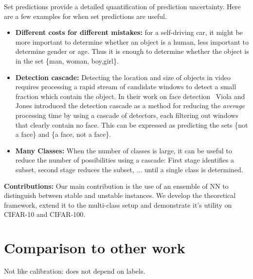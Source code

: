 \documentclass{article}
\begin{document}
Set predictions provide a detailed quantification of prediction uncertainty. Here are a few examples for when set predictions are useful.
\begin{itemize}
    \item {\bf Different costs for different mistakes:} for a self-driving car, it might be more important to determine whether an object is a human, less important to determine gender or age. Thus it is enough to determine whether the object is in the set \{man, woman, boy,girl\}. 
    \item {\bf Detection cascade:} Detecting the location and size of objects in video requires processing a rapid stream of candidate windows to detect a small fraction which contain the object. In their work on face detection~\cite{ViolaJones} Viola and Jones introduced the detection cascade as a method for reducing the {\em average} processing time by using a cascade of detectors, each filtering out windows that clearly contain no face. This can be expressed as predicting the sets \{not a face\} and \{a face, not a face\}.
    \item {\bf Many Classes:} When the number of classes is large, it can be useful to reduce the number of possibilities using a cascade: First stage identifies a subset, second stage reduces the subset, ... until a single class is determined. 
\end{itemize}

{\bf Contributions:} Our main contribution is the use of an ensemble of NN to distinguish between stable and unstable instances. We develop the theoretical framework, extend it to the multi-class setup and demonstrate it's utility on CIFAR-10 and CIFAR-100.


\section{Comparison to other work}
\label{sec:OtherWork}
Not like calibration: does not depend on labels.
\end{document}
